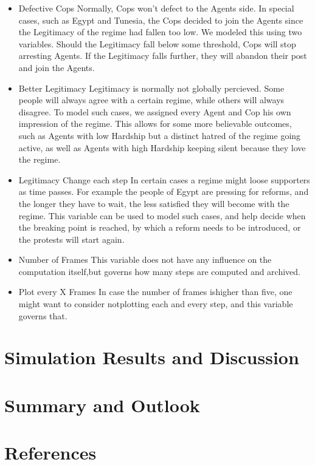 \documentclass[11pt]{article}
\begin{document}
\begin{itemize}
\item Defective Cops\newline
Normally, Cops won't defect to the Agents side. In special cases, such as Egypt and Tunesia, the Cops decided to join the Agents since the Legitimacy of the regime had fallen too low. We modeled this using two variables. Should the Legitimacy fall below some threshold, Cops will stop arresting Agents. If the Legitimacy falls further, they will abandon their post and join the Agents.

\item Better Legitimacy\newline
Legitimacy is normally not globally percieved. Some people will always agree with a certain regime, while others will always disagree. To model such cases, we assigned every Agent and Cop his own impression of the regime. This allows for some more believable outcomes, such as Agents with low Hardship but a distinct hatred of the regime going active, as well as Agents with high Hardship keeping silent because they love the regime.

\item Legitimacy Change each step\newline
In certain cases a regime might loose supporters as time passes. For example the people of Egypt are pressing for reforms, and the longer they have to wait, the less satisfied they will become with the regime. This variable can be used to model such cases, and help decide when the breaking point is reached, by which a reform needs to be introduced, or the protests will start again.

\item Number of Frames\newline
This variable does not have any influence on the computation itself,but governs how many steps are computed and archived.

\item Plot every X Frames\newline
In case the number of frames ishigher than five, one might want to consider notplotting each and every step, and this variable governs that.

\end{itemize}

\section{Simulation Results and Discussion}

\section{Summary and Outlook}

\section{References}
\end{document}

